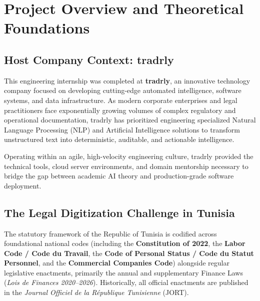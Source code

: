 \documentclass[12pt,a4paper]{report}
\begin{document}
\chapter{Project Overview and Theoretical Foundations}

\section{Host Company Context: tradrly}
This engineering internship was completed at \textbf{tradrly}, an innovative technology company focused on developing cutting-edge automated intelligence, software systems, and data infrastructure. As modern corporate enterprises and legal practitioners face exponentially growing volumes of complex regulatory and operational documentation, tradrly has prioritized engineering specialized Natural Language Processing (NLP) and Artificial Intelligence solutions to transform unstructured text into deterministic, auditable, and actionable intelligence.

Operating within an agile, high-velocity engineering culture, tradrly provided the technical tools, cloud server environments, and domain mentorship necessary to bridge the gap between academic AI theory and production-grade software deployment.

\section{The Legal Digitization Challenge in Tunisia}
The statutory framework of the Republic of Tunisia is codified across foundational national codes (including the \textbf{Constitution of 2022}, the \textbf{Labor Code / Code du Travail}, the \textbf{Code of Personal Status / Code du Statut Personnel}, and the \textbf{Commercial Companies Code}) alongside regular legislative enactments, primarily the annual and supplementary Finance Laws (\textit{Lois de Finances 2020--2026}). Historically, all official enactments are published in the \textit{Journal Officiel de la R\'epublique Tunisienne} (JORT).
\end{document}
